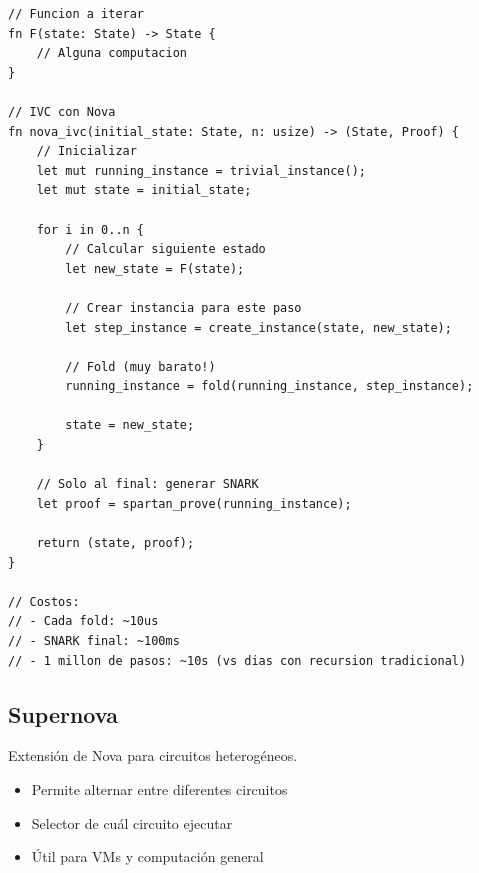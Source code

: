 \documentclass[11pt,a4paper,twoside]{book}
\begin{document}
\begin{example}
\begin{lstlisting}[style=rust]
// Funcion a iterar
fn F(state: State) -> State {
    // Alguna computacion
}

// IVC con Nova
fn nova_ivc(initial_state: State, n: usize) -> (State, Proof) {
    // Inicializar
    let mut running_instance = trivial_instance();
    let mut state = initial_state;
    
    for i in 0..n {
        // Calcular siguiente estado
        let new_state = F(state);
        
        // Crear instancia para este paso
        let step_instance = create_instance(state, new_state);
        
        // Fold (muy barato!)
        running_instance = fold(running_instance, step_instance);
        
        state = new_state;
    }
    
    // Solo al final: generar SNARK
    let proof = spartan_prove(running_instance);
    
    return (state, proof);
}

// Costos:
// - Cada fold: ~10us
// - SNARK final: ~100ms
// - 1 millon de pasos: ~10s (vs dias con recursion tradicional)
\end{lstlisting}
\end{example}

\subsection{Supernova}

Extensi\'on de Nova para circuitos heterog\'eneos.

\begin{itemize}
    \item Permite alternar entre diferentes circuitos
    \item Selector de cu\'al circuito ejecutar
    \item \'Util para VMs y computaci\'on general
\end{itemize}
\end{document}
